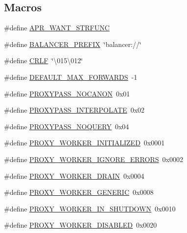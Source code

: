 \subsection*{Macros}
\begin{DoxyCompactItemize}
\item 
\#define \hyperlink{group__MOD__PROXY_ga88a4bf7f483aad3f3945773f3383e713}{A\+P\+R\+\_\+\+W\+A\+N\+T\+\_\+\+S\+T\+R\+F\+U\+NC}
\item 
\#define \hyperlink{group__MOD__PROXY_gaaf7d23b31bf384aa5486370ad925880f}{B\+A\+L\+A\+N\+C\+E\+R\+\_\+\+P\+R\+E\+F\+IX}~\char`\"{}balancer\+://\char`\"{}
\item 
\#define \hyperlink{group__MOD__PROXY_ga6cb23a858b0a21bdaa644b9181dc415f}{C\+R\+LF}~\char`\"{}\textbackslash{}015\textbackslash{}012\char`\"{}
\item 
\#define \hyperlink{group__MOD__PROXY_ga56c44c29f5eae0aee458e54759d66428}{D\+E\+F\+A\+U\+L\+T\+\_\+\+M\+A\+X\+\_\+\+F\+O\+R\+W\+A\+R\+DS}~-\/1
\item 
\#define \hyperlink{group__MOD__PROXY_ga68eff5a895dcf8ab40078745e3160b6a}{P\+R\+O\+X\+Y\+P\+A\+S\+S\+\_\+\+N\+O\+C\+A\+N\+ON}~0x01
\item 
\#define \hyperlink{group__MOD__PROXY_ga550ab16ae63601e6d0238a9051a07530}{P\+R\+O\+X\+Y\+P\+A\+S\+S\+\_\+\+I\+N\+T\+E\+R\+P\+O\+L\+A\+TE}~0x02
\item 
\#define \hyperlink{group__MOD__PROXY_gabe5fec84c97375731569cb19d336a98e}{P\+R\+O\+X\+Y\+P\+A\+S\+S\+\_\+\+N\+O\+Q\+U\+E\+RY}~0x04
\item 
\#define \hyperlink{group__MOD__PROXY_ga55f1fe4d773fda3175784b955d58376b}{P\+R\+O\+X\+Y\+\_\+\+W\+O\+R\+K\+E\+R\+\_\+\+I\+N\+I\+T\+I\+A\+L\+I\+Z\+ED}~0x0001
\item 
\#define \hyperlink{group__MOD__PROXY_ga441434c1320a5dc4b6ac30cf96629426}{P\+R\+O\+X\+Y\+\_\+\+W\+O\+R\+K\+E\+R\+\_\+\+I\+G\+N\+O\+R\+E\+\_\+\+E\+R\+R\+O\+RS}~0x0002
\item 
\#define \hyperlink{group__MOD__PROXY_gac3f64b9704fd80f6dfa0611a299ce601}{P\+R\+O\+X\+Y\+\_\+\+W\+O\+R\+K\+E\+R\+\_\+\+D\+R\+A\+IN}~0x0004
\item 
\#define \hyperlink{group__MOD__PROXY_ga8236178e6bf3b95fe1202aba128332ba}{P\+R\+O\+X\+Y\+\_\+\+W\+O\+R\+K\+E\+R\+\_\+\+G\+E\+N\+E\+R\+IC}~0x0008
\item 
\#define \hyperlink{group__MOD__PROXY_ga7bedac8f869c6f342a6b3782fb1a91a0}{P\+R\+O\+X\+Y\+\_\+\+W\+O\+R\+K\+E\+R\+\_\+\+I\+N\+\_\+\+S\+H\+U\+T\+D\+O\+WN}~0x0010
\item 
\#define \hyperlink{group__MOD__PROXY_gaec616b415ef52a885a3cf6bf6e700517}{P\+R\+O\+X\+Y\+\_\+\+W\+O\+R\+K\+E\+R\+\_\+\+D\+I\+S\+A\+B\+L\+ED}~0x0020

\end{DoxyCompactItemize}
